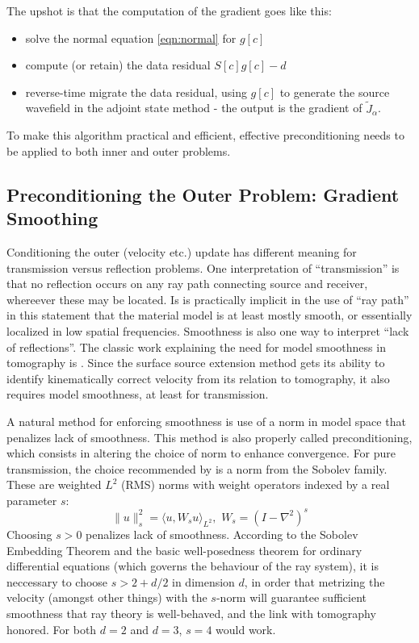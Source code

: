 The upshot is that the computation of the gradient goes like this:
\begin{itemize}
\item solve the normal equation \ref{eqn:normal} for $g[c]$
\item compute (or retain) the data residual $S[c]g[c]-d$
\item reverse-time migrate the data residual, using $g[c]$ to generate the source wavefield in the adjoint state method - the output is the gradient of $\tilde{J}_{\alpha}$.
\end{itemize}

To make this algorithm practical and efficient, effective preconditioning needs to be applied to both inner and outer problems.

\subsection{Preconditioning the Outer Problem: Gradient Smoothing}
Conditioning the outer (velocity etc.) update has different meaning for transmission versus reflection problems. One interpretation of ``transmission'' is that no reflection occurs on any ray path connecting source and receiver, whereever these may be located. Is is practically implicit in the use of ``ray path'' in this statement that the material model is at least mostly smooth, or essentially localized in low spatial frequencies. Smoothness is also one way to interpret ``lack of reflections''. The classic work explaining the need for model smoothness in tomography is \cite{DelpratLailly:92}. Since the surface source extension method gets its ability to identify kinematically correct velocity from its relation to tomography, it also requires model smoothness, at least for transmission.

A natural method for enforcing smoothness is use of a norm in model space that penalizes lack of smoothness. This method is also properly called preconditioning, which consists in altering the choice of norm to enhance convergence. For pure transmission, the choice recommended by \cite[]{DelpratLailly:92} is a norm from the Sobolev family. These are weighted $L^2$ (RMS) norms with weight operators indexed by a real parameter $s$:
\begin{equation}
\label{eqn:sob}
\|u\|^2_s = \langle u, W_s u \rangle_{L^2},\,\,W_s = (I - \nabla^2)^s
\end{equation}
Choosing $s>0$ penalizes lack of smoothness. According to the Sobolev Embedding Theorem and the basic well-posedness theorem for ordinary differential equations (which governs the behaviour of the ray system), it is neccessary to choose $s > 2 + d/2$ in dimension $d$, in order that metrizing the velocity (amongst other things) with the $s$-norm will guarantee sufficient smoothness that ray theory is well-behaved, and the link with tomography honored. For both $d=2$ and $d=3$, $s=4$ would work.

